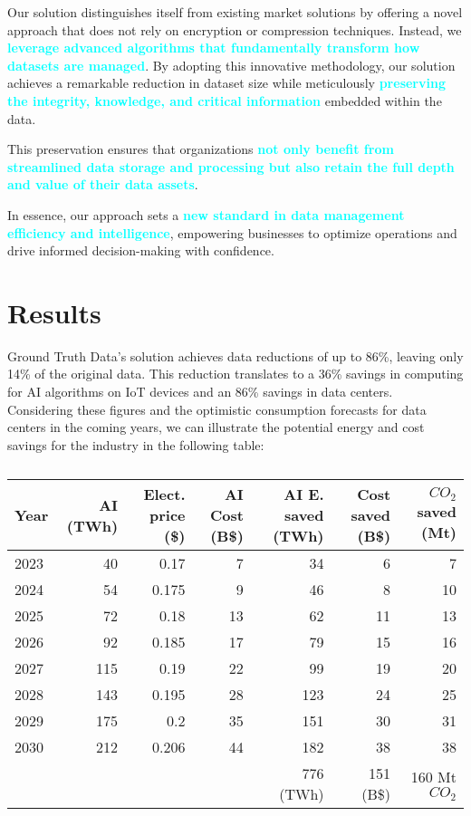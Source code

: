 Our solution distinguishes itself from existing market solutions by offering a novel approach that does not rely on encryption or compression techniques. Instead, we \textbf{\textcolor{cyan}{leverage advanced algorithms that fundamentally transform how datasets are managed}}. By adopting this innovative methodology, our solution achieves a remarkable reduction in dataset size while meticulously \textbf{\textcolor{cyan}{preserving the integrity, knowledge, and critical information}} embedded within the data. 

This preservation ensures that organizations \textbf{\textcolor{cyan}{not only benefit from streamlined data storage and processing but also retain the full depth and value of their data assets}}. 

In essence, our approach sets a \textbf{\textcolor{cyan}{new standard in data management efficiency and intelligence}}, empowering businesses to optimize operations and drive informed decision-making with confidence.

\section{Results}

Ground Truth Data's solution achieves data reductions of up to 86\%, leaving only 14\% of the original data. This reduction translates to a 36\% savings in computing for AI algorithms on IoT devices and an 86\% savings in data centers.\\


Considering these figures and the optimistic consumption forecasts for data centers in the coming years, we can illustrate the potential energy and cost savings for the industry in the following table:

\begin{table}[H]
    \centering
    \footnotesize
    \begin{tabular}{|lrrrrrr}
        \toprule
        Year & AI (TWh) & Elect. price (\$) & AI Cost (B\$) & AI E. saved (TWh) & Cost saved (B\$)  & $CO_2$ saved (Mt)  \\
        \midrule
        2023 & 40  & 0.17  & 7  & 34  & 6  & 7  \\
        2024 & 54  & 0.175 & 9  & 46  & 8  & 10 \\
        2025 & 72  & 0.18  & 13 & 62  & 11 & 13 \\
        2026 & 92  & 0.185 & 17 & 79  & 15 & 16 \\
        2027 & 115 & 0.19  & 22 & 99  & 19 & 20 \\
        2028 & 143 & 0.195 & 28 & 123 & 24 & 25 \\
        2029 & 175 & 0.2   & 35 & 151 & 30 & 31 \\
        2030 & 212 & 0.206 & 44 & 182 & 38 & 38 \\
        \midrule
        & & & & 776 (TWh) & 151 (B\$) & 160 Mt $CO_2$ \\
        \bottomrule
    \end{tabular}
    \caption{}
    \label{tab:ai_summary}
\end{table}
